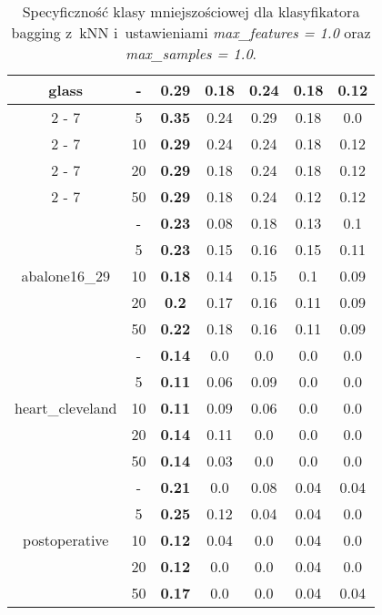 \begin{table}[H]
\begin{center}
{\begin{tabular}{c|c|ccccc}
				\hline%
				\multirow{5}{*}{glass}&{-}&\textbf{0.29}&0.18&0.24&0.18&0.12\\%
				\cline{2%
					-%
					7}%
				&5&\textbf{0.35}&0.24&0.29&0.18&0.0\\%
				\cline{2%
					-%
					7}%
				&10&\textbf{0.29}&0.24&0.24&0.18&0.12\\%
				\cline{2%
					-%
					7}%
				&20&\textbf{0.29}&0.18&0.24&0.18&0.12\\%
				\cline{2%
					-%
					7}%
				&50&\textbf{0.29}&0.18&0.24&0.12&0.12\\%
				\hline%
				\multirow{5}{*}{abalone16\_29}&{-}&\textbf{0.23}&0.08&0.18&0.13&0.1\\%
				\cline{2%
					-%
					7}%
				&5&\textbf{0.23}&0.15&0.16&0.15&0.11\\%
				\cline{2%
					-%
					7}%
				&10&\textbf{0.18}&0.14&0.15&0.1&0.09\\%
				\cline{2%
					-%
					7}%
				&20&\textbf{0.2}&0.17&0.16&0.11&0.09\\%
				\cline{2%
					-%
					7}%
				&50&\textbf{0.22}&0.18&0.16&0.11&0.09\\%
				\hline%
				\multirow{5}{*}{heart\_cleveland}&{-}&\textbf{0.14}&0.0&0.0&0.0&0.0\\%
				\cline{2%
					-%
					7}%
				&5&\textbf{0.11}&0.06&0.09&0.0&0.0\\%
				\cline{2%
					-%
					7}%
				&10&\textbf{0.11}&0.09&0.06&0.0&0.0\\%
				\cline{2%
					-%
					7}%
				&20&\textbf{0.14}&0.11&0.0&0.0&0.0\\%
				\cline{2%
					-%
					7}%
				&50&\textbf{0.14}&0.03&0.0&0.0&0.0\\%
				\hline%
				\multirow{5}{*}{postoperative}&{-}&\textbf{0.21}&0.0&0.08&0.04&0.04\\%
				\cline{2%
					-%
					7}%
				&5&\textbf{0.25}&0.12&0.04&0.04&0.0\\%
				\cline{2%
					-%
					7}%
				&10&\textbf{0.12}&0.04&0.0&0.04&0.0\\%
				\cline{2%
					-%
					7}%
				&20&\textbf{0.12}&0.0&0.0&0.04&0.0\\%
				\cline{2%
					-%
					7}%
				&50&\textbf{0.17}&0.0&0.0&0.04&0.04\\%
				\hline%
			\end{tabular}}
			\caption{Specyficzność klasy mniejszościowej dla klasyfikatora bagging z~kNN i~ustawieniami \textit{max\_features = 1.0} oraz \textit{max\_samples = 1.0}.}
			\label{baggingknnspec}
		\end{center}
	\end{table}
